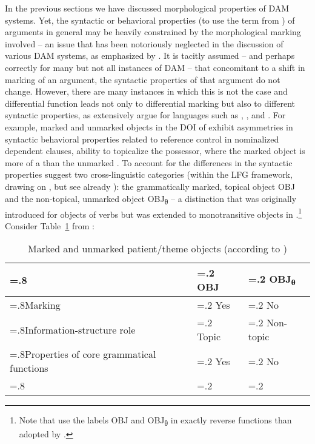 \documentclass[output=paper]{LSP/langsci}
\begin{document}
In the previous sections we have discussed morphological properties of DAM systems. 
Yet, the syntactic or behavioral properties (to use the term from \citealt{Keenan1976Towards}) of arguments in general may be heavily constrained by the morphological marking involved – an issue that has been notoriously neglected in the discussion of various DAM systems, as emphasized by \citet[17, 140--141]{Dalrympleetal2011Objects}. 
It is tacitly assumed – and perhaps correctly for many but not all instances of DAM – that concomitant to a shift in marking of an argument, the syntactic properties of that argument do not change. 
However, there are many instances in which this is not the case and differential function leads not only to differential marking but also to different syntactic properties, as \citet[140--168]{Dalrympleetal2011Objects} extensively argue for languages such as , ,  and . 
For example, marked and unmarked objects in the DOI of  exhibit asymmetries in syntactic behavioral properties related to reference control in nominalized dependent clauses, ability to topicalize the possessor, \etc where the marked object is more of a  than the unmarked \citep[17]{Dalrympleetal2011Objects}. 
To account for the differences in the syntactic properties \citet[141]{Dalrympleetal2011Objects} suggest two cross-linguistic categories (within the LFG framework, drawing on \citealt{Buttetal1996Structural}, but see already \citealt[158]{Bossong1991Differential}): the grammatically marked, topical object OBJ and the non-topical, unmarked object OBJ\textsubscript{θ} – a distinction that was originally introduced for objects of  verbs but was extended to monotransitive objects in \citet{Buttetal1996Structural}.\footnote{Note that \citet{Buttetal1996Structural} use the labels OBJ and OBJ\textsubscript{θ} in exactly reverse functions than adopted by \citet{Dalrympleetal2011Objects}.} 
Consider Table~\ref{01-wi-tab:4:Marking} from \citet[141]{Dalrympleetal2011Objects}:

\begin{table}
\begin{tabularx}{\textwidth}{>{\hsize=.8\hsize}X>{\hsize=.2\hsize}X>{\hsize=.2\hsize}X}
\lsptoprule
	 & OBJ & OBJ\textsubscript{θ}\\ 
\midrule
Marking & Yes & No\\ 
Information-structure role & Topic & Non-topic\\ 
Properties of core grammatical functions & Yes & No\\ 
\lspbottomrule
\end{tabularx}
\caption{Marked and unmarked patient/theme objects (according to \citealt[141]{Dalrympleetal2011Objects})}
\label{01-wi-tab:4:Marking}
\end{table}
\end{document}
